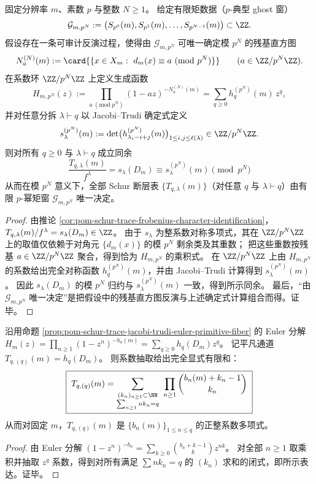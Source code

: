 \begin{proposition}\label{prop:pom-schur-channels-mod-pN-from-ptypical-ghost}
固定分辨率 \(m\)、素数 \(p\) 与整数 \(N\ge 1\)。
给定有限矩数据（\(p\)-典型 ghost 窗）
\[
\mathcal G_{m,p^N}:=\bigl(S_{p^0}(m),S_{p^1}(m),\dots,S_{p^{N-1}}(m)\bigr)\subset\ZZ.
\]
假设存在一条可审计反演过程，使得由 \(\mathcal G_{m,p^N}\) 可唯一确定模 \(p^N\) 的残基直方图
\[
N_a^{(N)}(m):=\card{\{x\in X_m:\ d_m(x)\equiv a\ (\mathrm{mod}\ p^N)\}}\qquad(a\in\ZZ/p^N\ZZ).
\]
在系数环 \(\ZZ/p^N\ZZ\) 上定义生成函数
\[
H_{m,p^N}(z)
:=\prod_{a\ (\mathrm{mod}\ p^N)}(1-az)^{-N_a^{(N)}(m)}
=\sum_{q\ge 0}h_q^{(p^N)}(m)\,z^q,
\]
并对任意分拆 \(\lambda\vdash q\) 以 Jacobi--Trudi 确定式定义
\[
s_\lambda^{(p^N)}(m):=\det\bigl(h_{\lambda_i-i+j}^{(p^N)}(m)\bigr)_{1\le i,j\le \ell(\lambda)}
\in \ZZ/p^N\ZZ.
\]
则对所有 \(q\ge 0\) 与 \(\lambda\vdash q\) 成立同余
\[
\boxed{\;
\frac{T_{q,\lambda}(m)}{f^\lambda}
=s_\lambda(D_m)
\equiv
s_\lambda^{(p^N)}(m)\pmod{p^N}\;}
\]
从而在模 \(p^N\) 意义下，全部 Schur 断层表 \(\{T_{q,\lambda}(m)\}\)（对任意 \(q\) 与 \(\lambda\vdash q\)）由有限 \(p\)-幂矩窗 \(\mathcal G_{m,p^N}\) 唯一决定。
\end{proposition}
\begin{proof}
由推论 \ref{cor:pom-schur-trace-frobenius-character-identification}，
\(
T_{q,\lambda}(m)/f^\lambda=s_\lambda(D_m)\in\ZZ
\)。
由于 \(s_\lambda\) 为整系数对称多项式，其在 \(\ZZ/p^N\ZZ\) 上的取值仅依赖于对角元 \(\{d_m(x)\}\) 的模 \(p^N\) 剩余类及其重数；
把这些重数按残基 \(a\in\ZZ/p^N\ZZ\) 聚合，得到恰为 \(H_{m,p^N}\) 的乘积式。
在 \(\ZZ/p^N\ZZ\) 上由 \(H_{m,p^N}\) 的系数给出完全对称函数 \(h_q^{(p^N)}(m)\)，并由 Jacobi--Trudi 计算得到 \(s_\lambda^{(p^N)}(m)\)。
因此 \(s_\lambda(D_m)\) 的模 \(p^N\) 归约与 \(s_\lambda^{(p^N)}(m)\) 一致，得到所示同余。
最后，“由 \(\mathcal G_{m,p^N}\) 唯一决定”是把假设中的残基直方图反演与上述确定式计算组合而得。证毕。
\end{proof}

\begin{proposition}\label{prop:pom-schur-trace-trivial-channel-primitive-fiber-expansion}
沿用命题 \ref{prop:pom-schur-trace-jacobi-trudi-euler-primitive-fiber} 的 Euler 分解
\(
H_m(z)=\prod_{n\ge 1}(1-z^n)^{-b_n(m)}=\sum_{q\ge 0}h_q(D_m)z^q
\)。
记平凡通道 \(T_{q,(q)}(m)=h_q(D_m)\)。
则系数抽取给出完全显式有限和：
\[
\boxed{\;
T_{q,(q)}(m)=
\sum_{\substack{(k_n)_{n\ge 1}\subset\NN\\ \sum_{n\ge 1}n k_n=q}}
\ \prod_{n\ge 1}\binom{b_n(m)+k_n-1}{k_n}\;}
\]
从而对固定 \(m\)，\(T_{q,(q)}(m)\) 是 \(\{b_n(m)\}_{1\le n\le q}\) 的正整系数多项式。
\end{proposition}
\begin{proof}
由 Euler 分解
\(
(1-z^n)^{-b_n}=\sum_{k\ge 0}\binom{b_n+k-1}{k}z^{nk}
\)。
对全部 \(n\ge 1\) 取乘积并抽取 \(z^q\) 系数，得到对所有满足 \(\sum n k_n=q\) 的 \((k_n)\) 求和的闭式，即所示表达。证毕。
\end{proof}

